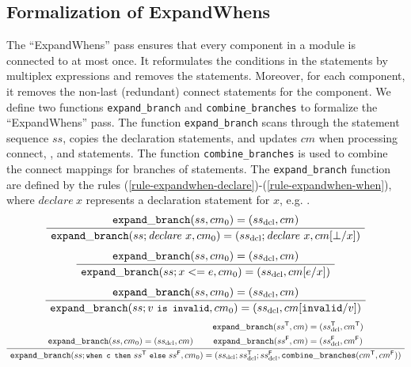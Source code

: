 \subsection{Formalization of ExpandWhens}
The ``ExpandWhens'' pass ensures that every component in a module is connected to at most once.
It reformulates the conditions in the  statements by multiplex expressions and removes the  statements. Moreover, for each component, it removes the non-last (redundant) connect statements for the component. 
We define two functions {\tt expand\_branch} and {\tt combine\_branches} to formalize the ``ExpandWhens'' pass. 
The function {\tt expand\_branch} scans through the statement sequence $ss$, copies the declaration statements, and updates $cm$ when processing connect, , and  statements.  The function {\tt combine\_branches} is used to combine the connect mappings for branches of  statements. 
The  {\tt expand\_branch} function are defined by the rules (\ref{rule-expandwhen-declare})-(\ref{rule-expandwhen-when}), where $\mathit{declare}\ x$ represents a declaration statement for $x$, e.g. . 
\begin{gather}
    \label{rule-expandwhen-declare}
    \infer[]
    {\seqq{{\tt expand\_branch}(ss ; \mathit{declare}\ x, cm_0) = (ss_\mathrm{dcl} ; \mathit{declare}\ x, cm[\bot/x])}}
    {\seqq{{\tt expand\_branch}(ss, cm_0) = (ss_\mathrm{dcl}, cm)}}
\\[1ex]
    \label{rule-expandwhen-connect}
    \infer[]
    {\seqq{{\tt expand\_branch}(ss ; x <= e, cm_0) = (ss_\mathrm{dcl}, cm [e/x])}}
    {\seqq{{\tt expand\_branch}(ss, cm_0) = (ss_\mathrm{dcl}, cm)}}
\\[1ex]
    \label{rule-expandwhen-invalid}
    \infer[]
    {\seqq{{\tt expand\_branch}(ss ; v \text{ \prettyll{is invalid}}, cm_0) = (ss_\mathrm{dcl}, cm [{\tt invalid}/v])}}
    {\seqq{{\tt expand\_branch}(ss, cm_0) = (ss_\mathrm{dcl}, cm)}}
\end{gather}
%
\begin{gather}
    \label{rule-expandwhen-when}
    \inferii[]
    {\seqq{{\tt expand\_branch}(ss ; \text{\prettyll{when c then} } ss^\mathsf{T} \text{ \prettyll{else} } ss^\mathsf{F}, cm_0) =
        (ss_\mathrm{dcl} ; ss_\mathrm{dcl}^\mathsf{T} ; ss_\mathrm{dcl}^\mathsf{F}, {\tt combine\_branches}(cm^\mathsf{T}, cm^\mathsf{F}))}}
    {\seqq{{\tt expand\_branch}(ss, cm_0) = (ss_\mathrm{dcl}, cm)}}
    {\begin{gathered}[b] \seqq{{\tt expand\_branch}(ss^\mathsf{T}, cm) = (ss_\mathrm{dcl}^\mathsf{T}, cm^\mathsf{T})} \\
                      \seqq{{\tt expand\_branch}(ss^\mathsf{F}, cm) = (ss_\mathrm{dcl}^\mathsf{F}, cm^\mathsf{F})} \end{gathered}}
\end{gather}

